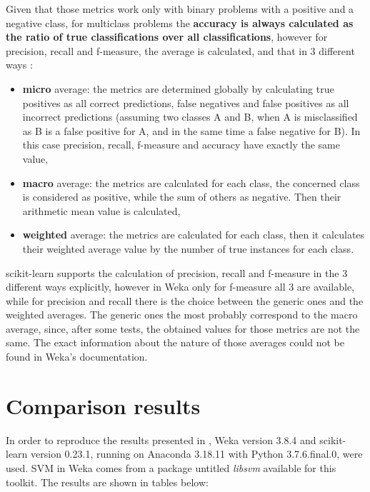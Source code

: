 Given that those metrics work only with binary problems with a positive and a negative class, for multiclass problems the \textbf{accuracy is always calculated as the ratio of true classifications over all classifications}, however for precision, recall and f-measure, the average is calculated, and that in 3 different ways \cite{shmueli_multi-class_2020}:

\begin{itemize}
    \item \textbf{micro} average: the metrics are determined globally by calculating true positives as all correct predictions, false negatives and false positives as all incorrect predictions (assuming two classes A and B, when A is misclassified as B is a false positive for A, and in the same time a false negative for B). In this case precision, recall, f-measure and accuracy have exactly the same value,
    \item \textbf{macro} average: the metrics are calculated for each class, the concerned class is considered as positive, while the sum of others as negative. Then their arithmetic mean value is calculated,
    \item \textbf{weighted} average: the metrics are calculated for each class, then it calculates their weighted average value by the number of true instances for each class.
\end{itemize}

scikit-learn supports the calculation of precision, recall and f-measure in the 3 different ways explicitly, however in Weka only for f-measure all 3 are available, while for precision and recall there is the choice between the generic ones and the weighted averages. The generic ones the most probably correspond to the macro average, since, after some tests, the obtained values for those metrics are not the same. The exact information about the nature of those averages could not be found in Weka's documentation.

\section{Comparison results}
In order to reproduce the results presented in \cite{borges_hink_machine_2014-1}, Weka version 3.8.4 and scikit-learn version 0.23.1, running on Anaconda 3.18.11 with Python 3.7.6.final.0, were used. SVM in Weka comes from a package untitled \textit{libsvm} available for this toolkit. The results are shown in tables below:


